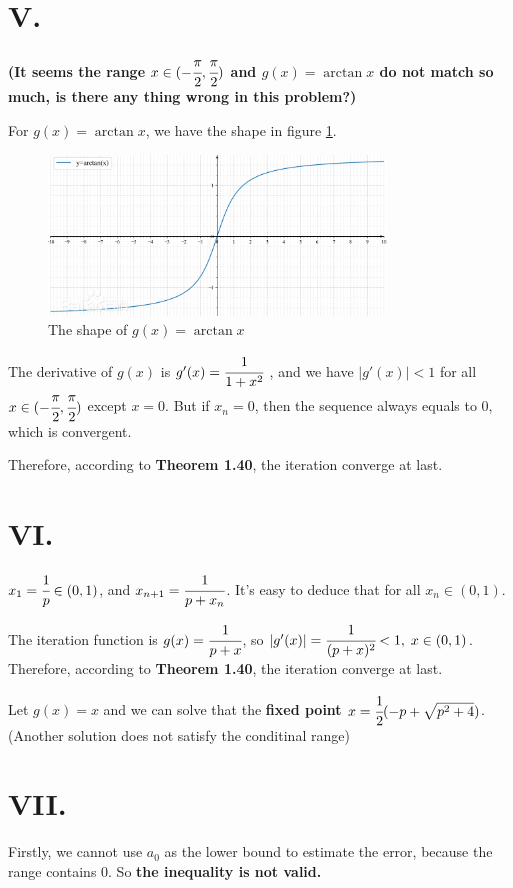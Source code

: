 \documentclass[a4paper]{article}
\begin{document}
\section*{V.}
\textbf{(It seems the range $x \in (-\cfrac{\pi}{2},\cfrac{\pi}{2})$ and $g(x) = \arctan{x}$ do not match so much, is there any thing wrong in this problem?)}

For $g(x) = \arctan{x}$, we have the shape in figure \ref{fig:arctan}.
\begin{figure}[h]
    \centering
    \includegraphics[width=0.8\textwidth]{arctan.png}   
    \caption{The shape of $g(x) = \arctan{x}$}
    \label{fig:arctan}
\end{figure}

The derivative of $g(x)$ is $g'(x) = \cfrac{1}{1+x^2}$ , and we have $|g'(x)| < 1$ for all $x \in (-\cfrac{\pi}{2},\cfrac{\pi}{2})$ except $x = 0$.
But if $x_n = 0$, then the sequence always equals to $0$, which is convergent.

Therefore, according to \textbf{Theorem 1.40}, the iteration converge at last.

\section*{VI.}
$x_1 = \cfrac{1}{p} \in (0,1)$, and $x_{n+1} = \cfrac{1}{p + x_n}$. It's easy to deduce that for all $x_n \in (0,1)$.

The iteration function is $g(x) = \cfrac{1}{p + x}$, so $|g'(x)| = \cfrac{1}{(p + x)^2} < 1, \; x \in (0,1)$.
Therefore, according to \textbf{Theorem 1.40}, the iteration converge at last.

Let $g(x) = x$ and we can solve that the \textbf{fixed point $x = \cfrac{1}{2}(-p + \sqrt{p^2 + 4})$}. (Another solution does not satisfy the conditinal range)

\section*{VII.}
Firstly, we cannot use $a_0$ as the lower bound to estimate the error, because the range contains $0$. So \textbf{the inequality is not valid. }
\end{document}
